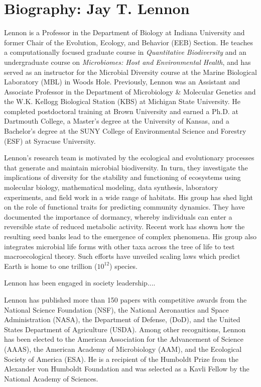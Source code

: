 \documentclass[11pt]{article}
\begin{document}
\section*{Biography: Jay T. Lennon}

Lennon is a Professor in the Department of Biology at Indiana University and former Chair of the Evolution, Ecology, and Behavior (EEB) Section. He teaches a computationally focused graduate course in \textit{Quantitative Biodiversity} and an undergraduate course on \textit{Microbiomes: Host and Environmental Health}, and has served as an instructor for the Microbial Diversity course at the Marine Biological Laboratory (MBL) in Woods Hole. Previously, Lennon was an Assistant and Associate Professor in the Department of Microbiology \& Molecular Genetics and the W.K. Kellogg Biological Station (KBS) at Michigan State University. He completed postdoctoral training at Brown University and earned a Ph.D. at Dartmouth College, a Master’s degree at the University of Kansas, and a Bachelor’s degree at the SUNY College of Environmental Science and Forestry (ESF) at Syracuse University.

Lennon’s research team is motivated by the ecological and evolutionary processes that generate and maintain microbial biodiversity. In turn, they investigate the implications of diversity for the stability and functioning of ecosystems using molecular biology, mathematical modeling, data synthesis, laboratory experiments, and field work in a wide range of habitats. His group has shed light on the role of functional traits for predicting community dynamics. They have documented the importance of dormancy, whereby individuals can enter a reversible state of reduced metabolic activity. Recent work has shown how the resulting seed banks lead to the emergence of complex phenomena. His group also integrates microbial life forms with other taxa across the tree of life to test macroecological theory. Such efforts have unveiled scaling laws which predict Earth is home to one trillion ($10^{12}$) species.

Lennon has been engaged in society leadership....

Lennon has published more than 150 papers with competitive awards from the National Science Foundation (NSF), the National Aeronautics and Space Administration (NASA), the Department of Defense, (DoD), and the United States Department of Agriculture (USDA). Among other recognitions, Lennon has been elected to the American Association for the Advancement of Science (AAAS), the American Academy of Microbiology (AAM), and the Ecological Society of America (ESA). He is a recipient of the Humboldt Prize from the Alexander von Humboldt Foundation and was selected as a Kavli Fellow by the National Academy of Sciences. 
\end{document}

